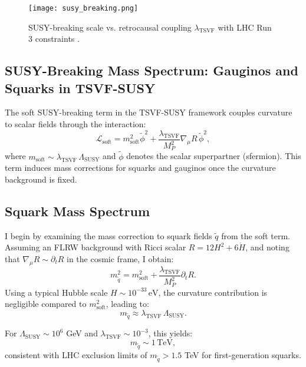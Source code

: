 \documentclass[twocolumn,superscriptaddress,floatfix]{revtex4-2}
\newcommand{\tsvf}{\lambda_{\text{TSVF}}}
\begin{document}
\begin{figure}[htbp]  
\centering  
\texttt{[image: susy\_breaking.png]}  
\caption{SUSY-breaking scale vs. retrocausal coupling \(\tsvf\) with LHC Run 3 constraints \cite{CMS2023}.} 
\label{fig:susy_breaking}  
\end{figure}

\subsection{SUSY-Breaking Mass Spectrum: Gauginos and Squarks in TSVF-SUSY}

The soft SUSY-breaking term in the TSVF-SUSY framework couples curvature to scalar fields through the interaction:
\begin{equation}
\mathcal{L}_{\text{soft}} = m_{\text{soft}}^2 \tilde{\phi}^2 + \frac{\lambda_{\text{TSVF}}}{M_P^2} \nabla_\mu R \, \tilde{\phi}^2,
\end{equation}
where $m_{\text{soft}} \sim \lambda_{\text{TSVF}} \, \Lambda_{\text{SUSY}}$ and $\tilde{\phi}$ denotes the scalar superpartner (sfermion). This term induces mass corrections for squarks and gauginos once the curvature background is fixed.

\subsection{Squark Mass Spectrum}

I begin by examining the mass correction to squark fields $\tilde{q}$ from the soft term. Assuming an FLRW background with Ricci scalar $R = 12H^2 + 6\dot{H}$, and noting that $\nabla_\mu R \sim \partial_t R$ in the cosmic frame, I obtain:
\begin{equation}
m_{\tilde{q}}^2 = m_{\text{soft}}^2 + \frac{\lambda_{\text{TSVF}}}{M_P^2} \partial_t R.
\end{equation}
Using a typical Hubble scale $H \sim 10^{-33} \, \text{eV}$, the curvature contribution is negligible compared to $m_{\text{soft}}^2$, leading to:
\begin{equation}
m_{\tilde{q}} \approx \lambda_{\text{TSVF}} \, \Lambda_{\text{SUSY}}.
\label{eq:squark_mass}
\end{equation}

For $\Lambda_{\text{SUSY}} \sim 10^6$ GeV and $\lambda_{\text{TSVF}} \sim 10^{-3}$, this yields:
\begin{equation}
m_{\tilde{q}} \sim 1 \, \text{TeV},
\end{equation}
consistent with LHC exclusion limits of $m_{\tilde{q}} > 1.5$ TeV for first-generation squarks.
\end{document}

